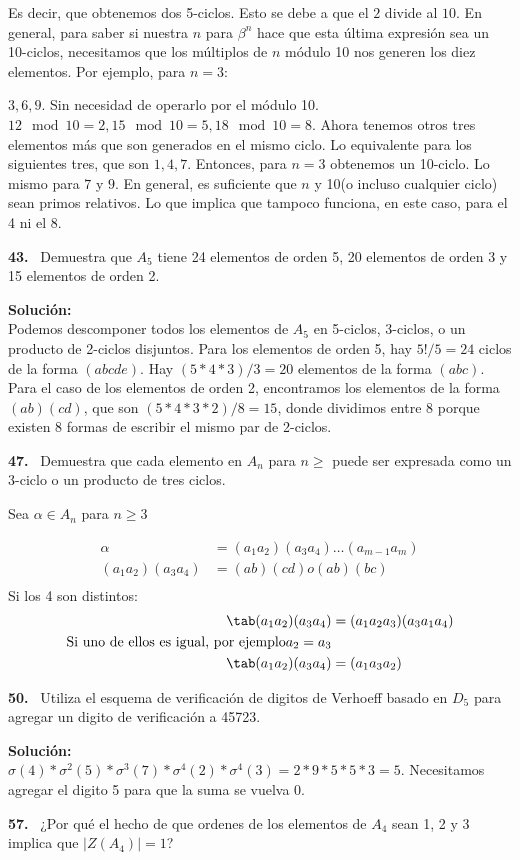 \documentclass{article}
\newcounter{problem}
\newcounter{solution}
\newcommand\Problem[1]{%
  \stepcounter{problem}%
  \textbf{#1.}~%
  \setcounter{solution}{0}%
}
\newcommand\TheSolution{%
  \textbf{Solución:}\\%
}
\begin{document}
Es decir, que obtenemos dos 5-ciclos. Esto se debe a que el $2$ divide al
$10$. En general, para saber si nuestra $n$ para $\beta ^{n}$ hace que esta
última expresión sea un 10-ciclos, necesitamos que los múltiplos de $n$ módulo
10 nos generen los diez elementos. Por ejemplo, para $n=3$:

$3,6,9$. Sin necesidad de operarlo por el módulo 10.
$12\mod10=2,15\mod10=5,18\mod10=8$. Ahora tenemos otros tres elementos más que
son generados en el mismo ciclo. Lo equivalente para los siguientes tres, que
son $1,4,7$. Entonces, para $n=3$ obtenemos un 10-ciclo. Lo mismo para $7$ y
$9$. En general, es suficiente que $n$ y 10(o incluso cualquier ciclo) sean
primos relativos. Lo que implica que tampoco funciona, en este caso, para el 4
ni el 8.

\Problem{43} Demuestra que $A_5$ tiene 24 elementos de orden 5, 20 elementos
de orden 3 y 15 elementos de orden 2.

\TheSolution{} Podemos descomponer todos los elementos de $A_5$ en 5-ciclos,
3-ciclos, o un producto de 2-ciclos disjuntos. Para los elementos de orden 5,
hay $5! / 5 = 24$ ciclos de la forma $(abcde)$. Hay $(5 * 4 * 3) / 3 = 20$
elementos de la forma $(abc)$. Para el caso de los elementos de orden 2,
encontramos los elementos de la forma $(ab)(cd)$, que son $(5 * 4 * 3 * 2)/8
= 15$, donde dividimos entre 8 porque existen 8 formas de escribir el mismo
par de 2-ciclos.

\Problem{47} Demuestra que cada elemento en $A_n$ para $n \geq$ puede ser
expresada como un 3-ciclo o un producto de tres ciclos.

Sea $\alpha \in A_n$ para $n \geq 3$

\[
\begin{split}
  \alpha           &= (a_1a_2)(a_3a_4)\dots(a_{m-1}a_m) \\
  (a_1a_2)(a_3a_4) &= (ab)(cd) o (ab)(bc) \\
\end{split}
\]
Si los 4 son distintos:
\[
\begin{split}
  \tab (a_1a_2) (a_3a_4) &= (a_1a_2a_3) (a_3a_1a_4)\\
  \text{Si uno de ellos es igual, por ejemplo} a_2 = a_3\\
  \tab (a_1a_2) (a_3a_4) &= (a_1a_3a_2)
\end{split}
\]

\Problem{50} Utiliza el esquema de verificación de digitos de Verhoeff basado
en $D_5$ para agregar un digito de verificación a 45723. 

\TheSolution{} $\sigma(4) * \sigma^{2}(5) * \sigma^{3}(7) * \sigma^{4}(2) *
\sigma^{4}(3) = 2 * 9 * 5 * 5 * 3 = 5$. Necesitamos agregar el digito 5 para
que la suma se vuelva 0.

\Problem{57} ¿Por qué el hecho de que ordenes de los elementos de $A_4$ sean
1, 2 y 3 implica que $|Z(A_4)| = 1$?
\end{document}
